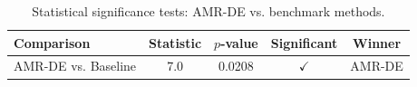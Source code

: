 \begin{table}[htbp]
\centering
\caption{Statistical significance tests: AMR-DE vs. benchmark methods.}
\label{tab:statistical_tests}
\begin{tabular}{lcccc}
\toprule
Comparison & Statistic & $p$-value & Significant & Winner \\
\midrule
AMR-DE vs. Baseline & 7.0 & 0.0208 & $\checkmark$ & AMR-DE \\
\bottomrule
\end{tabular}
\end{table}